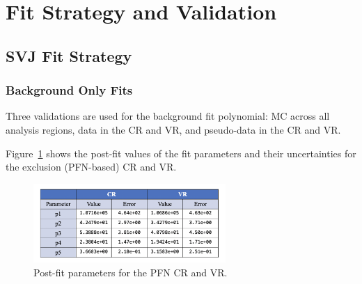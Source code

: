\section{Fit Strategy and Validation}
\label{sec:fit_strategy}
\subsection{SVJ Fit Strategy}
\label{subsec:fit_exclusion}




\subsubsection{Background Only Fits}
\label{subsec:fit_bkgonly}

Three validations are used for the background fit polynomial: MC across all analysis regions, data in the CR and VR, and pseudo-data in the CR and VR. 

Figure~\ref{fig:postfit_param_pfn} shows the post-fit values of the fit parameters and their uncertainties for the exclusion (PFN-based) CR and VR. 
\begin{figure}[!htbp]
\centering
   \includegraphics[width=0.65\textwidth]{figures/stats/postfit_param_pfn}
    \caption{Post-fit parameters for the PFN CR and VR.
    \label{fig:postfit_param_pfn}}
\end{figure}

